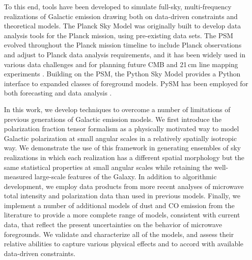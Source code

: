 \documentclass[twocolumn]{aastex631}
\begin{document}
To this end, tools have been developed to simulate full-sky, multi-frequency realizations of Galactic emission drawing both on data-driven constraints and theoretical models. The Planck Sky Model \citep[PSM;][]{delabrouille2012} was originally built to develop data analysis tools for the Planck mission, using pre-existing data sets. The PSM evolved throughout the Planck mission timeline to include Planck observations and adjust to Planck data analysis requirements, and it has been widely used in various data challenges and for planning future CMB and 21\,cm line mapping experiments \citep[e.g.,][]{Remazeilles:2018, Fornazier:2022, Ghosh:2022}. Building on the PSM, the Python Sky Model \citep[PySM;][]{Thorne:2017} provides a Python interface to expanded classes of foreground models. PySM has been employed for both forecasting \citep[e.g.,][]{Abazajian:2022, Hensley:2022, CCAT-PrimeCollaboration:2023, Wolz:2024} and data analysis \citep[e.g.,][]{Vacher:2023, SPIDERCollaboration:2024}.

In this work, we develop techniques to overcome a number of limitations of previous generations of Galactic emission models. We first introduce the polarization fraction tensor formalism as a physically motivated way to model Galactic polarization at small angular scales in a relatively spatially isotropic way. We demonstrate the use of this framework in generating ensembles of sky realizations in which each realization has a different spatial morphology but the same statistical properties at small angular scales while retaining the well-measured large-scale features of the Galaxy. In addition to algorithmic development, we employ data products from more recent analyses of microwave total intensity and polarization data than used in previous models. Finally, we implement a number of additional models of dust and CO emission from the literature to provide a more complete range of models, consistent with current data, that reflect the present uncertainties on the behavior of microwave foregrounds. We validate and characterize all of the models, and assess their relative abilities to capture various physical effects and to accord with available data-driven constraints.  

\end{document}
